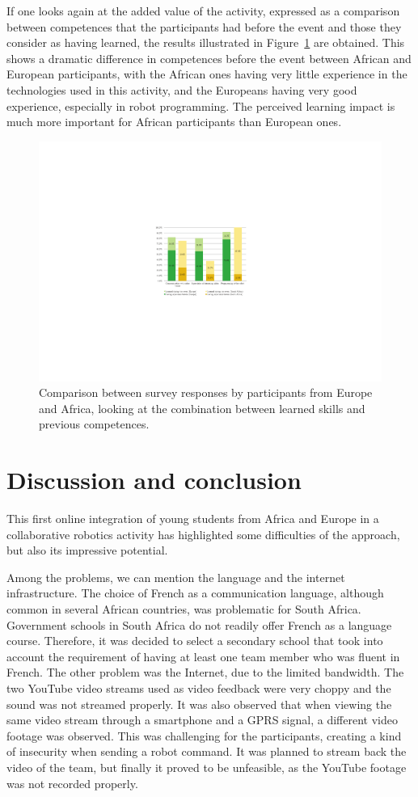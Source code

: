 \documentclass{intech-journal}
\begin{document}
If one looks again at the added value of the activity, expressed as a comparison between competences that the participants had before the event and those they consider as having learned, the results illustrated in Figure~\ref{fig:EU-SA-learn} are obtained.
This shows a dramatic difference in competences before the event between African and European participants, with the African ones having very little experience in the technologies used in this activity, and the Europeans having very good experience, especially in robot programming. 
The perceived learning impact is much more important for African participants than European ones. 

\begin{figure}[ht]
 \centering
    \includegraphics[width=0.6\columnwidth]{figures/EU-SA-learned.pdf}
  \caption{Comparison between survey responses by participants from Europe and Africa, looking at the combination between learned skills and previous competences.}
  \label{fig:EU-SA-learn} 
\end{figure}


\section{Discussion and conclusion}

This first online integration of young students from Africa and Europe in a collaborative robotics activity has highlighted some difficulties of the approach, but also its impressive potential.

Among the problems, we can mention the language and the internet infrastructure.
The choice of French as a communication language, although common in several African countries, was problematic for South Africa.
Government schools in South Africa do not readily offer French as a language course.
Therefore, it was decided to select a secondary school that took into account the requirement of having at least one team member who was fluent in French. 
The other problem was the Internet, due to the limited bandwidth. 
The two YouTube video streams used as video feedback were very choppy and the sound was not streamed properly.
It was also observed that when viewing the same video stream through a smartphone and a GPRS signal, a different video footage was observed. 
This was challenging for the participants, creating a kind of insecurity when sending a robot command.
It was planned to stream back the video of the team, but finally it proved to be unfeasible, as the YouTube footage was not recorded properly.
\end{document}
